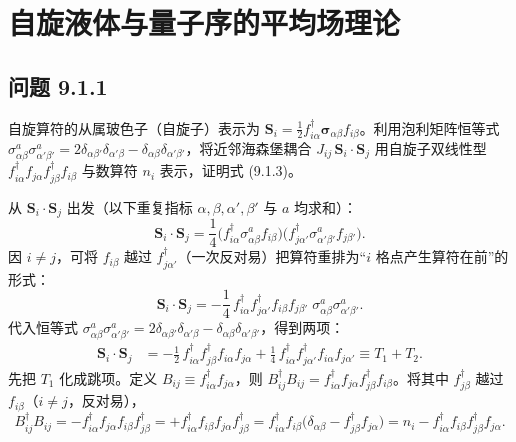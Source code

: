 \chapter{自旋液体与量子序的平均场理论}

\section*{问题 9.1.1}
\begin{problem}
自旋算符的从属玻色子（自旋子）表示为 $\pmb{S}_i=\frac12 f^{\dagger}_{i\alpha}\pmb{\sigma}_{\alpha\beta}f_{i\beta}$。利用泡利矩阵恒等式 $\sigma^a_{\alpha\beta}\sigma^a_{\alpha'\beta'}=2\delta_{\alpha\beta'}\delta_{\alpha'\beta}-\delta_{\alpha\beta}\delta_{\alpha'\beta'}$，将近邻海森堡耦合 $J_{ij}\,\pmb{S}_i\cdot\pmb{S}_j$ 用自旋子双线性型 $f^{\dagger}_{i\alpha}f_{j\alpha}f^{\dagger}_{j\beta}f_{i\beta}$ 与数算符 $n_i$ 表示，证明式 (9.1.3)。
\end{problem}
\solution
从 $\pmb{S}_i\cdot\pmb{S}_j$ 出发（以下重复指标 $\alpha,\beta,\alpha',\beta'$ 与 $a$ 均求和）：
\begin{equation*}
\pmb{S}_i\cdot\pmb{S}_j=\frac14\big(f^{\dagger}_{i\alpha}\sigma^a_{\alpha\beta}f_{i\beta}\big)\big(f^{\dagger}_{j\alpha'}\sigma^a_{\alpha'\beta'}f_{j\beta'}\big).
\end{equation*}
因 $i\neq j$，可将 $f_{i\beta}$ 越过 $f^{\dagger}_{j\alpha'}$（一次反对易）把算符重排为“$i$ 格点产生算符在前”的形式：
\begin{equation*}
\pmb{S}_i\cdot\pmb{S}_j=-\frac14\,f^{\dagger}_{i\alpha}f^{\dagger}_{j\alpha'}f_{i\beta}f_{j\beta'}\;\sigma^a_{\alpha\beta}\sigma^a_{\alpha'\beta'}.
\end{equation*}
代入恒等式 $\sigma^a_{\alpha\beta}\sigma^a_{\alpha'\beta'}=2\delta_{\alpha\beta'}\delta_{\alpha'\beta}-\delta_{\alpha\beta}\delta_{\alpha'\beta'}$，得到两项：
\begin{align*}
\pmb{S}_i\cdot\pmb{S}_j&=-\frac12\,f^{\dagger}_{i\alpha}f^{\dagger}_{j\beta}f_{i\alpha}f_{j\alpha}
+\frac14\,f^{\dagger}_{i\alpha}f^{\dagger}_{j\alpha'}f_{i\alpha}f_{j\alpha'}\equiv T_1+T_2 .
\end{align*}
先把 $T_1$ 化成跳项。定义 $B_{ij}\equiv f^{\dagger}_{i\alpha}f_{j\alpha}$，则 $B^{\dagger}_{ij}B_{ij}=f^{\dagger}_{i\alpha}f_{j\alpha}f^{\dagger}_{j\beta}f_{i\beta}$。将其中 $f^{\dagger}_{j\beta}$ 越过 $f_{i\beta}$（$i\neq j$，反对易），
\begin{equation*}
B^{\dagger}_{ij}B_{ij}=-f^{\dagger}_{i\alpha}f_{j\alpha}f_{i\beta}f^{\dagger}_{j\beta}
=+f^{\dagger}_{i\alpha}f_{i\beta}f_{j\alpha}f^{\dagger}_{j\beta}
=f^{\dagger}_{i\alpha}f_{i\beta}\big(\delta_{\alpha\beta}-f^{\dagger}_{j\beta}f_{j\alpha}\big)
=n_i-f^{\dagger}_{i\alpha}f_{i\beta}f^{\dagger}_{j\beta}f_{j\alpha}.
\end{equation*}
